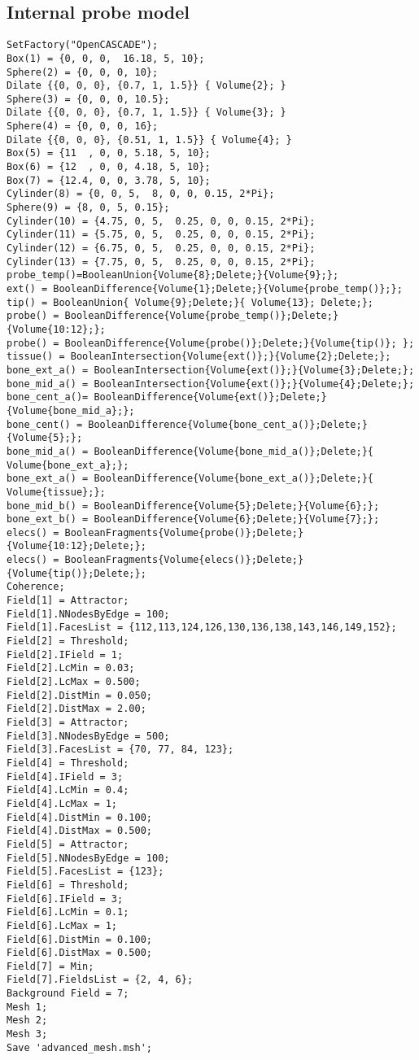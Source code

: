 \begin{appendices}
\section{Internal probe model}
\begin{Verbatim}[fontsize=\footnotesize]
SetFactory("OpenCASCADE"); 
Box(1) = {0, 0, 0,  16.18, 5, 10};
Sphere(2) = {0, 0, 0, 10};
Dilate {{0, 0, 0}, {0.7, 1, 1.5}} { Volume{2}; }
Sphere(3) = {0, 0, 0, 10.5};
Dilate {{0, 0, 0}, {0.7, 1, 1.5}} { Volume{3}; }
Sphere(4) = {0, 0, 0, 16};
Dilate {{0, 0, 0}, {0.51, 1, 1.5}} { Volume{4}; }
Box(5) = {11  , 0, 0, 5.18, 5, 10}; 
Box(6) = {12  , 0, 0, 4.18, 5, 10}; 
Box(7) = {12.4, 0, 0, 3.78, 5, 10}; 
Cylinder(8) = {0, 0, 5,  8, 0, 0, 0.15, 2*Pi};
Sphere(9) = {8, 0, 5, 0.15};
Cylinder(10) = {4.75, 0, 5,  0.25, 0, 0, 0.15, 2*Pi};
Cylinder(11) = {5.75, 0, 5,  0.25, 0, 0, 0.15, 2*Pi};
Cylinder(12) = {6.75, 0, 5,  0.25, 0, 0, 0.15, 2*Pi};
Cylinder(13) = {7.75, 0, 5,  0.25, 0, 0, 0.15, 2*Pi};
probe_temp()=BooleanUnion{Volume{8};Delete;}{Volume{9};}; 
ext() = BooleanDifference{Volume{1};Delete;}{Volume{probe_temp()};};
tip() = BooleanUnion{ Volume{9};Delete;}{ Volume{13}; Delete;};
probe() = BooleanDifference{Volume{probe_temp()};Delete;}{Volume{10:12};};
probe() = BooleanDifference{Volume{probe()};Delete;}{Volume{tip()}; };
tissue() = BooleanIntersection{Volume{ext()};}{Volume{2};Delete;};
bone_ext_a() = BooleanIntersection{Volume{ext()};}{Volume{3};Delete;};
bone_mid_a() = BooleanIntersection{Volume{ext()};}{Volume{4};Delete;};
bone_cent_a()= BooleanDifference{Volume{ext()};Delete;}{Volume{bone_mid_a};};
bone_cent() = BooleanDifference{Volume{bone_cent_a()};Delete;}{Volume{5};};
bone_mid_a() = BooleanDifference{Volume{bone_mid_a()};Delete;}{ Volume{bone_ext_a};};
bone_ext_a() = BooleanDifference{Volume{bone_ext_a()};Delete;}{ Volume{tissue};};
bone_mid_b() = BooleanDifference{Volume{5};Delete;}{Volume{6};};
bone_ext_b() = BooleanDifference{Volume{6};Delete;}{Volume{7};};
elecs() = BooleanFragments{Volume{probe()};Delete;}{Volume{10:12};Delete;};
elecs() = BooleanFragments{Volume{elecs()};Delete;}{Volume{tip()};Delete;};
Coherence; 
Field[1] = Attractor; 
Field[1].NNodesByEdge = 100; 
Field[1].FacesList = {112,113,124,126,130,136,138,143,146,149,152}; 
Field[2] = Threshold; 
Field[2].IField = 1; 
Field[2].LcMin = 0.03; 
Field[2].LcMax = 0.500; 
Field[2].DistMin = 0.050; 
Field[2].DistMax = 2.00; 
Field[3] = Attractor; 
Field[3].NNodesByEdge = 500; 
Field[3].FacesList = {70, 77, 84, 123}; 
Field[4] = Threshold; 
Field[4].IField = 3; 
Field[4].LcMin = 0.4; 
Field[4].LcMax = 1; 
Field[4].DistMin = 0.100; 
Field[4].DistMax = 0.500; 
Field[5] = Attractor; 
Field[5].NNodesByEdge = 100; 
Field[5].FacesList = {123}; 
Field[6] = Threshold; 
Field[6].IField = 3; 
Field[6].LcMin = 0.1; 
Field[6].LcMax = 1; 
Field[6].DistMin = 0.100; 
Field[6].DistMax = 0.500; 
Field[7] = Min;
Field[7].FieldsList = {2, 4, 6};
Background Field = 7;
Mesh 1;
Mesh 2;
Mesh 3;
Save 'advanced_mesh.msh';
\end{Verbatim}


\end{appendices}
